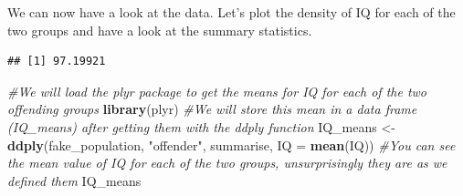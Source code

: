 \documentclass[]{book}
\newenvironment{Shaded}{\begin{snugshade}}{\end{snugshade}}
\newcommand{\CommentTok}[1]{\textcolor[rgb]{0.56,0.35,0.01}{\textit{#1}}}
\newcommand{\DataTypeTok}[1]{\textcolor[rgb]{0.13,0.29,0.53}{#1}}
\newcommand{\DecValTok}[1]{\textcolor[rgb]{0.00,0.00,0.81}{#1}}
\newcommand{\KeywordTok}[1]{\textcolor[rgb]{0.13,0.29,0.53}{\textbf{#1}}}
\newcommand{\NormalTok}[1]{#1}
\newcommand{\OperatorTok}[1]{\textcolor[rgb]{0.81,0.36,0.00}{\textbf{#1}}}
\newcommand{\StringTok}[1]{\textcolor[rgb]{0.31,0.60,0.02}{#1}}
\theoremstyle{definition}
\theoremstyle{definition}
\theoremstyle{definition}
\theoremstyle{remark}
\begin{document}
\begin{Shaded}
\end{Shaded}

We can now have a look at the data. Let's plot the density of IQ for
each of the two groups and have a look at the summary statistics.

\begin{Shaded}
\end{Shaded}

\begin{verbatim}
## [1] 97.19921
\end{verbatim}

\begin{Shaded}
\begin{Highlighting}[]
\CommentTok{#We will load the plyr package to get the means for IQ for each of the two offending groups}
\KeywordTok{library}\NormalTok{(plyr)}
\CommentTok{#We will store this mean in a data frame (IQ_means) after getting them with the ddply function}
\NormalTok{IQ_means <-}\StringTok{ }\KeywordTok{ddply}\NormalTok{(fake_population, }\StringTok{"offender"}\NormalTok{, summarise, }\DataTypeTok{IQ =} \KeywordTok{mean}\NormalTok{(IQ))}
\CommentTok{#You can see the mean value of IQ for each of the two groups, unsurprisingly they are as we defined them}
\NormalTok{IQ_means}
\end{Highlighting}
\end{Shaded}
\end{document}
